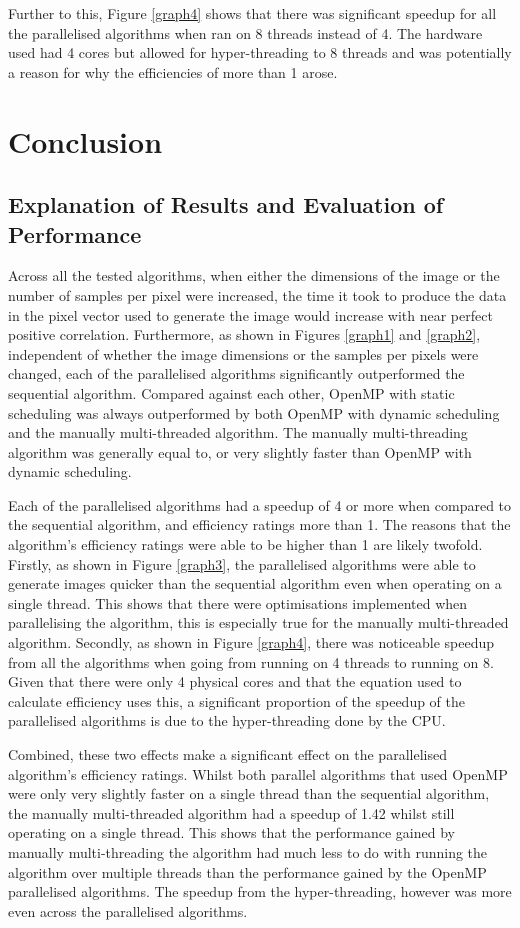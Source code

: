 \documentclass[journal,transmag]{IEEEtran}
\begin{document}
	Further to this, Figure \ref{graph4} shows that there was significant speedup for all the parallelised algorithms when ran on 8 threads instead of 4. The hardware used had 4 cores but allowed for hyper-threading to 8 threads and was potentially a reason for why the efficiencies of more than 1 arose.
	
	\section{Conclusion}
	\subsection{Explanation of Results and Evaluation of Performance}
	Across all the tested algorithms, when either the dimensions of the image or the number of samples per pixel were increased, the time it took to produce the data in the pixel vector used to generate the image would increase with near perfect positive correlation. Furthermore, as shown in Figures \ref{graph1} and \ref{graph2}, independent of whether the image dimensions or the samples per pixels were changed, each of the parallelised algorithms significantly outperformed the sequential algorithm. Compared against each other, OpenMP with static scheduling was always outperformed by both OpenMP with dynamic scheduling	 and the manually multi-threaded algorithm. The manually multi-threading algorithm was generally equal to, or very slightly faster than OpenMP with dynamic scheduling.
	
	Each of the parallelised algorithms had a speedup of 4 or more when compared to the sequential algorithm, and efficiency ratings more than 1. The reasons that the algorithm's efficiency ratings were able to be higher than 1 are likely twofold. Firstly, as shown in Figure \ref{graph3}, the parallelised algorithms were able to generate images quicker than the sequential algorithm even when operating on a single thread. This shows that there were optimisations implemented when parallelising the algorithm, this is especially true for the manually multi-threaded algorithm. Secondly, as shown in Figure \ref{graph4}, there was noticeable speedup from all the algorithms when going from running on 4 threads to running on 8. Given that there were only 4 physical cores and that the equation used to calculate efficiency uses this, a significant proportion of the speedup of the parallelised algorithms is due to the hyper-threading done by the CPU. 
	
	Combined, these two effects make a significant effect on the parallelised algorithm's efficiency ratings. Whilst both parallel algorithms that used OpenMP were only very slightly faster on a single thread than the sequential algorithm, the manually multi-threaded algorithm had a speedup of 1.42 whilst still operating on a single thread. This shows that the performance gained by manually multi-threading the algorithm had much less to do with running the algorithm over multiple threads than the performance gained by the OpenMP parallelised algorithms. The speedup from the hyper-threading, however was more even across the parallelised algorithms.
	
\end{document}
